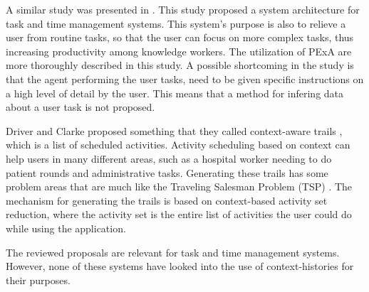 A similar study was presented in \cite{myers2007intelligent}. This study proposed a system architecture for task and time management systems. This system's purpose is also to relieve a user from routine tasks, so that the user can focus on more complex tasks, thus increasing productivity among knowledge workers. The utilization of PExA are more thoroughly described in this study. A possible shortcoming in the study is that the agent performing the user tasks, need to be given specific instructions on a high level of detail by the user. This means that a method for infering data about a user task is not proposed.

Driver and Clarke proposed something that they called context-aware trails \cite{driver2008application}, which is a list of scheduled activities. Activity scheduling based on context can help users in many different areas, such as a hospital worker needing to do patient rounds and administrative tasks. Generating these trails has some problem areas that are much like the Traveling Salesman Problem (TSP) \cite{lawler1985traveling}. The mechanism for generating the trails is based on context-based activity set reduction, where the activity set is the entire list of activities the user could do while using the application.

The reviewed proposals are relevant for task and time management systems. However, none of these systems have looked into the use of context-histories for their purposes.